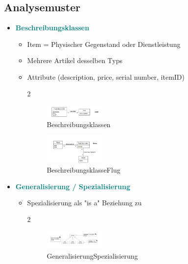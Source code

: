 \documentclass{article}
\begin{document}
\subsection{Analysemuster}
\begin{itemize}
	\item \textcolor {teal} {\textbf{Beschreibungsklassen}}
	\begin{itemize}
		\item Item = Physischer Gegenstand oder Dienstleistung
		\item Mehrere Artikel desselben Typs
		\item Attribute (description, price, serial number, itemID)
			\begin{multicols} {2} \begin{figure}[H]
				\centering
				\includegraphics[width=0.3\textwidth] {Resources/Images/Beschreibungsklassen.png}
			\caption{\label{fig:Beschreibungsklassen}Beschreibungsklassen}
	\end{figure} 
	\columnbreak 
	\begin{figure}[H]
	\centering
	\includegraphics[width=0.3\textwidth] {Resources/Images/BeschreibungsklasseFlug.png}
	\caption{\label{fig:BeschreibungsklasseFlug}BeschreibungsklasseFlug}
	\end{figure} 
			\end{multicols}
	\end{itemize}
	\item \textcolor {teal} {\textbf{Generalisierung / Spezialisierung}}
	\begin{itemize}
		\item Spezialisierung als "is a" Beziehung zu 
					\begin{multicols} {2} \begin{figure}[H]
				\centering
				\includegraphics[width=0.3\textwidth] {Resources/Images/GeneralisierungSpezialisierung.png}
			\caption{\label{fig:GeneralisierungSpezialisierung}GeneralisierungSpezialisierung}

\end{figure}
\end{multicols}
\end{itemize}
\end{itemize}
\end{document}
